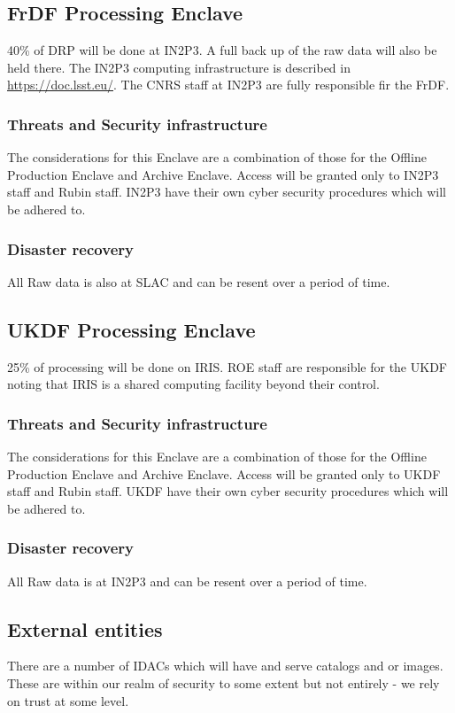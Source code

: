 \subsection{FrDF Processing  \gls{Enclave}}
40\% of \gls{DRP} will be done at \gls{IN2P3}.
A full back up of the raw data will also be held there.
The \gls{IN2P3} computing infrastructure is described in \url{https://doc.lsst.eu/}.
The \gls{CNRS} staff at \gls{IN2P3} are fully responsible fir the \gls{FrDF}.

\subsubsection{Threats and Security infrastructure}
The considerations for this Enclave are a combination of those for the Offline Production Enclave and \gls{Archive} Enclave.
Access will be granted only to \gls{IN2P3} staff and Rubin staff.
IN2P3 have their own cyber security procedures which will be adhered to.
\subsubsection{Disaster recovery}
All Raw data is also at \gls{SLAC} and can be resent over a period of time.

\subsection{UKDF Processing  \gls{Enclave}}
25\% of processing will be done on \gls{IRIS}.
\gls{ROE} staff are responsible for the \gls{UKDF} noting that \gls{IRIS} is a shared computing facility beyond their control.

\subsubsection{Threats and Security infrastructure}
The considerations for this Enclave are a combination of those for the Offline Production Enclave and \gls{Archive} Enclave.
Access will be granted only to \gls{UKDF} staff and Rubin staff.
UKDF have their own cyber security procedures which will be adhered to.
\subsubsection{Disaster recovery}
All Raw data is at \gls{IN2P3} and can be resent over a period of time.


\subsection{External entities}
There are a number of \gls{IDAC}s which will have and serve catalogs and or images.
These are within our realm of security to some extent but not entirely - we rely on trust at some level.
